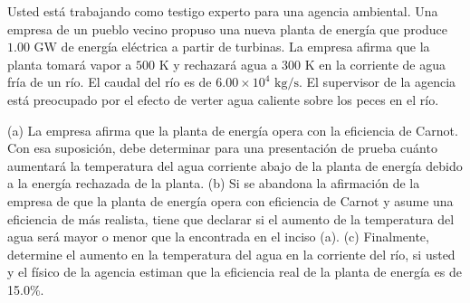 \item Usted está trabajando como testigo experto para una agencia ambiental. Una empresa de un pueblo vecino propuso una nueva planta de energía que produce $1.00\text{ GW}$ de energía eléctrica a partir de turbinas. La empresa afirma que la planta tomará vapor a $500\text{ K}$ y rechazará agua a $300\text{ K}$ en la corriente de agua fría de un río. El caudal del río es de $6.00 \times 10^4\text{ kg/s}$. El supervisor de la agencia está preocupado por el efecto de verter agua caliente sobre los peces en el río. 

(a) La empresa afirma que la planta de energía opera con la eficiencia de Carnot. Con esa suposición, debe determinar para una presentación de prueba cuánto aumentará la temperatura del agua corriente abajo de la planta de energía debido a la energía rechazada de la planta. 
(b) Si se abandona la afirmación de la empresa de que la planta de energía opera con eficiencia de Carnot y asume una eficiencia de más realista, tiene que declarar si el aumento de la temperatura del agua será mayor o menor que la encontrada en el inciso (a). 
(c) Finalmente, determine el aumento en la temperatura del agua en la corriente del río, si usted y el físico de la agencia estiman que la eficiencia real de la planta de energía es de 15.0\%.
